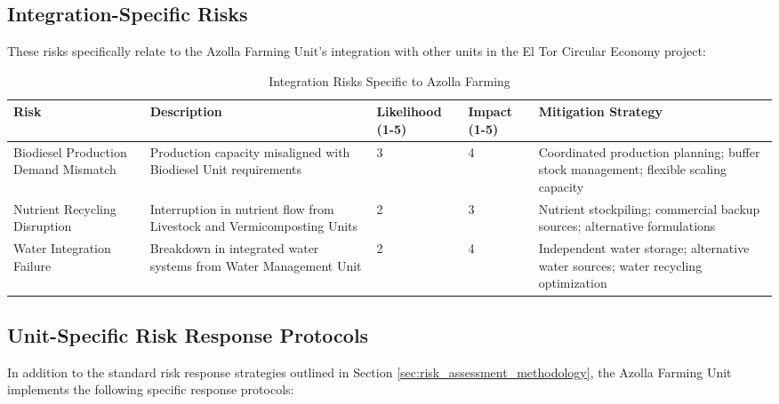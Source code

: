 \subsection{Integration-Specific Risks}

These risks specifically relate to the Azolla Farming Unit's integration with other units in the El Tor Circular Economy project:

\begin{table}[h]
\centering
\begin{tabular}{|p{3cm}|p{3cm}|p{2cm}|p{2cm}|p{4cm}|}
\hline
\textbf{Risk} & \textbf{Description} & \textbf{Likelihood (1-5)} & \textbf{Impact (1-5)} & \textbf{Mitigation Strategy} \\
\hline
Biodiesel Production Demand Mismatch & Production capacity misaligned with Biodiesel Unit requirements & 3 & 4 & Coordinated production planning; buffer stock management; flexible scaling capacity \\
\hline
Nutrient Recycling Disruption & Interruption in nutrient flow from Livestock and Vermicomposting Units & 2 & 3 & Nutrient stockpiling; commercial backup sources; alternative formulations \\
\hline
Water Integration Failure & Breakdown in integrated water systems from Water Management Unit & 2 & 4 & Independent water storage; alternative water sources; water recycling optimization \\
\hline
\end{tabular}
\caption{Integration Risks Specific to Azolla Farming}
\end{table}

\subsection{Unit-Specific Risk Response Protocols}

In addition to the standard risk response strategies outlined in Section \ref{sec:risk_assessment_methodology}, the Azolla Farming Unit implements the following specific response protocols:

